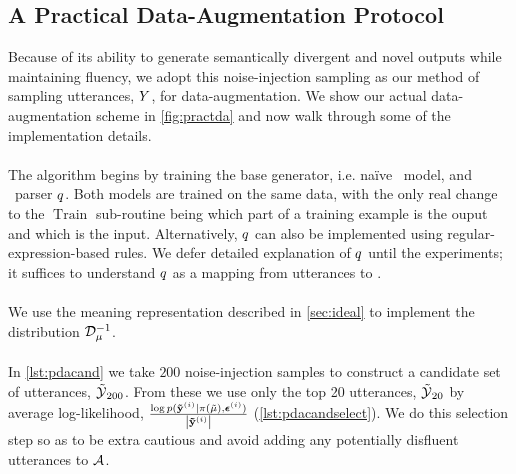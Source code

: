 \subsection{A Practical Data-Augmentation Protocol}
\label{sec:daprotos}




Because of its ability to generate semantically divergent and novel
outputs while maintaining fluency, we adopt this noise-injection
sampling as our method of sampling utterances, $Y$, for 
data-augmentation. We show our actual data-augmentation scheme in
\autoref{fig:practda} and now walk through some of the implementation details.

\paragraph{}
The algorithm begins by training the base generator, i.e. na{\"i}ve 
\sequencetosequence~model, and \meaningrepresentation~parser $q$. 
Both models are trained on the same data, with the only real change to the 
$\operatorname{Train}$ sub-routine being which part of a training example
is the ouput and which is the input. Alternatively, $q$ can 
also be implemented using regular-expression-based rules. We defer detailed 
explanation of $q$ until the experiments; it suffices to understand
$q$ as a mapping from utterances to \meaningrepresentations.




\paragraph{}
We use the meaning representation described in \autoref{sec:ideal} to implement
 the distribution $\mathcal{D}_{\mu}^{-1}$. 

\paragraph{}
    In \autoref{lst:pdacand} we take $200$ noise-injection samples to construct
    a candidate set of utterances, $\mathcal{\tilde{\mathcal{Y}}}_{200}$. 
    From these we use only the top 20 utterances, $\mathcal{\tilde{\mathcal{Y}}}_{20}$ by average log-likelihood,
    $\frac{\log p(\boldsymbol{\tilde{\mathbf{y}}}^{(i)}|\pi(\tilde{\mu}), \boldsymbol{\epsilon}^{(i)})}{{\left\vert \boldsymbol{\tilde{\mathbf{y}}}^{(i)} \right\vert}}$ (\autoref{lst:pdacandselect}).
    We do this selection step so as to be extra cautious and avoid adding
    any potentially disfluent utterances to ${\mathcal{A}}$.
    
